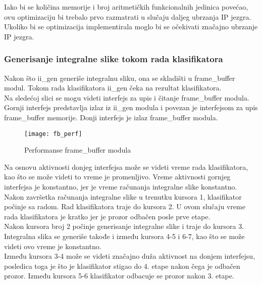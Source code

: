 Iako bi se količina memorije i broj aritmetičkih funkcionalnih jedinica povećao,
ovu optimizaciju bi trebalo prvo razmatrati u slučaju daljeg ubrzanja IP jezgra.
Ukoliko bi se optimizacija implementirala moglo bi se očekivati značajno ubrzanje IP jezgra.

\subsubsection{Generisanje integralne slike tokom rada klasifikatora}

Nakon što ii\_gen generiše integralnu sliku, ona se skladišti u frame\_buffer
modul.
Tokom rada klasifikatora ii\_gen čeka na rezultat klasifikatora. \\

Na sledećoj slici se mogu videti interfejs za upis i čitanje frame\_buffer
modula.
Gornji interfejs predstavlja izlaz iz ii\_gen modula i povezan je interfejsom za
upis frame\_buffer memorije.
Donji interfejs je izlaz frame\_buffer modula. \\

\begin{figure}[H]
  \centering
  \texttt{[image: fb\_perf]}
  \caption{Performanse frame\_buffer modula}
  \label{fb_perf}
\end{figure}

Na osnovu aktivnosti donjeg interfejsa može se videti vreme rada klasifikatora, kao što se
može videti to vreme je promenljivo.
Vreme aktivnosti gornjeg interfejsa je konstantno, jer je vreme računanja
integralne slike konstantno. \\

Nakon završetka računanja integralne slike u trenutku kursora 1, klasifikator
počinje sa radom.
Rad klasifikatora traje do kursora 2.
U ovom slučaju vreme rada klasifikatora je kratko jer je prozor odbačen posle
prve etape. \\

Nakon kursora broj 2 počinje generisanje integralne slike i traje do kursora 3.
Integralna slika se generiše takođe i između kursora 4-5 i 6-7, kao što se može
videti ovo vreme je konstantno. \\

Između kursora 3-4 može se videti značajno duža aktivnost na donjem interfejsu,
posledica toga je što je klasifikator stigao do 4. etape nakon čega je odbačen prozor.
Između kursora 5-6 klasifikator odbacuje se prozor nakon 3. etape. \\

